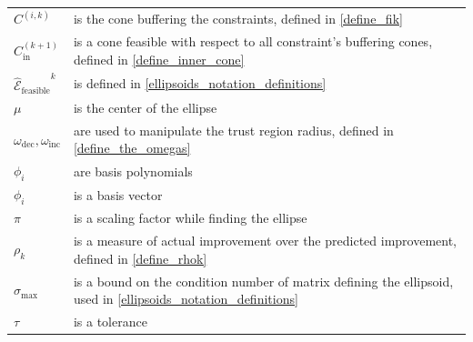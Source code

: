 \documentclass{article}
\theoremstyle{case}
\numberwithin{theorem}{subsection}
\newcommand{\fcki}{{C^{(k+1)}_{\textrm{in}}}}
\newcommand{\omegadec}{\omega_{\text{dec}}}
\newcommand{\omegainc}{\omega_{\text{inc}}}
\newcommand{\rk}{\rho_k}
\newcommand{\scaledunshiftedellipsoid}{{{\mathcal {\hat E}_{\text{feasible}}}^k}}
\newcommand{\sigmamax}{{\sigma_{\textrm{max}}}}
\newcommand{\fik}{{C^{(i, k)}}}
\begin{document}
\begin{longtable}{| p{} | p{} |}
$\fik $ & is the cone buffering the constraints, defined in \cref{define_fik} \\ %
$\fcki $ & is a cone feasible with respect to all constraint's buffering cones, defined in \cref{define_inner_cone} \\ %
$\scaledunshiftedellipsoid$ & is defined in \cref{ellipsoids_notation_definitions} \\ %
$\mu$ & is the center of the ellipse \\ %
$\omegadec, \omegainc$ & are used to manipulate the trust region radius, defined in \cref{define_the_omegas} \\ %
$\phi_i$ & are basis polynomials \\ %
$\phi_i$ & is a basis vector \\ %
$\pi$ & is a scaling factor while finding the ellipse \\ %
$\rk$ & is a measure of actual improvement over the predicted improvement, defined in \cref{define_rhok} \\ %
$\sigmamax$ & is a bound on the condition number of matrix defining the ellipsoid, used in \cref{ellipsoids_notation_definitions} \\ %
$\tau$ & is a tolerance \\ %

\end{longtable}
\end{document}
